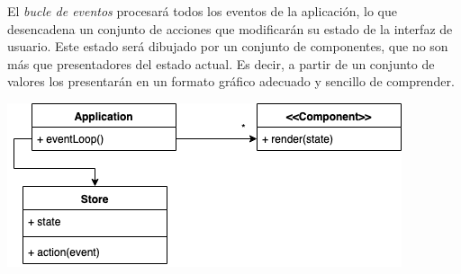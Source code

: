  El  \textit{bucle de eventos} procesará todos los eventos de la aplicación, lo que desencadena un conjunto de acciones que modificarán su estado de la interfaz de usuario. Este estado será dibujado por un conjunto de componentes, que no son más que presentadores del estado actual. Es decir, a partir de un conjunto de valores los presentarán en un formato gráfico adecuado y sencillo de comprender.

\vspace{5mm}
\begin{minipage}[h]{0.8\linewidth}
	\centering
	\includegraphics[width=\linewidth]{assets/ui}
	\label{img:ui}
\end{minipage}

\label{sec:ui}